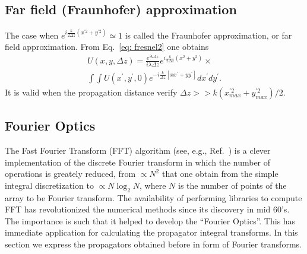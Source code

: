 \documentclass{iucr}              %
\begin{document}
%
%

\subsection{Far field (Fraunhofer) approximation}


The case when $e^{i \frac{k}{2 \Delta z} (x^{\prime 2} + y^{\prime 2} )} \simeq 1$ is called the Fraunhofer approximation, or far field approximation. From Eq.~\ref{eq: fresnel2} one obtains 
\begin{multline}\label{eq: fraunhoffer}
U(x,y, \Delta z) = \frac {e^{ik\Delta z }}{ i \lambda \Delta z}  e^{ i \frac{k}{2 \Delta z} (x^2 + y^2) } \times \\
\int \int  U(x^\prime, y^\prime, 0)  e^{-i \frac{k}{\Delta z} [x  x^\prime + y y^\prime]} dx^\prime dy^\prime .
\end{multline}
It is valid when the propagation distance verify $\Delta z >>k (x^{\prime 2}_{max} + y^{\prime 2}_{max})/2 $.  


\subsection{Fourier Optics}

The Fast Fourier Transform (FFT) algorithm (see, e.g., Ref.~\cite{10.2307/2003354}) is a clever implementation of the discrete Fourier transform in which the number of operations is greately reduced, from $\propto N^2$ that one obtain from the simple integral discretization to $\propto N \log_2 N$, where $N$ is the number of points of the array to be Fourier transform. The availability of performing libraries to compute FFT has revolutionized the numerical methods since its discovery in mid 60's. The importance is such that it helped to develop the ``Fourier Optics''. This has immediate application for calculating the propagator integral transforms. In this section we express the propagators obtained before in form of Fourier transforms. 
\end{document}
